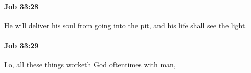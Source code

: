 		\paragraph{Job 33:28} %
			\label{JOB-33-28}

			He will deliver his soul from going into the pit, and his life shall see the light.


		\paragraph{Job 33:29} %
			\label{JOB-33-29}

			Lo, all these things worketh God oftentimes with man,



